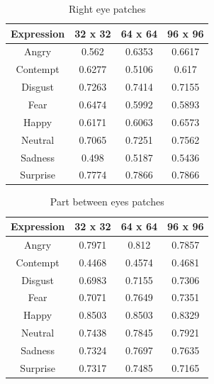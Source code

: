 \begin{table}
\caption{Right eye patches}
\label{table:right_eye}

\begin{tabular}{| c | c | c | c |}
\hline
Expression & 32 x 32 &  64 x 64  & 96 x 96  \\

\hline
Angry    & 0.562 & 0.6353 & 0.6617 \\
Contempt & 0.6277 & 0.5106 & 0.617 \\ 
Disgust	 & 0.7263 & 0.7414 & 0.7155 \\
Fear	 & 0.6474 & 0.5992 & 0.5893 \\
Happy	 & 0.6171 & 0.6063 & 0.6573 \\
Neutral  & 0.7065 & 0.7251 & 0.7562 \\
Sadness  & 0.498 & 0.5187 & 0.5436 \\
Surprise & 0.7774 & 0.7866 & 0.7866 \\

\hline
\end{tabular}
\end{table}

\begin{table}
\caption{Part between eyes patches}
\label{table:between_eyes}

\begin{tabular}{| c | c | c | c |}
\hline
Expression & 32 x 32 &  64 x 64  & 96 x 96  \\

\hline
Angry & 0.7971 & 0.812 & 0.7857 \\
Contempt & 0.4468 & 0.4574 & 0.4681 \\
Disgust & 0.6983 & 0.7155 & 0.7306 \\
Fear & 0.7071 & 0.7649 & 0.7351 \\
Happy & 0.8503 & 0.8503 & 0.8329 \\
Neutral & 0.7438 & 0.7845 & 0.7921 \\
Sadness & 0.7324 & 0.7697 & 0.7635 \\
Surprise & 0.7317 & 0.7485 & 0.7165 \\

\hline
\end{tabular}
\end{table}


